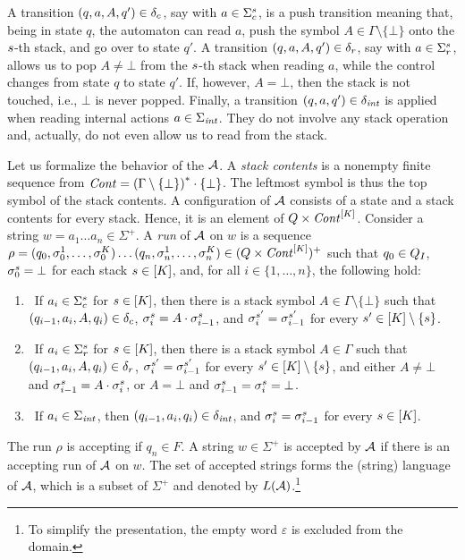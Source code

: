 \documentclass{LMCS}
\begin{document}
A transition $(q,a,A,q') \in \delta_c$, say with $a \in \Sigma_c^s$, is a
push transition meaning that, being in state $q$, the automaton can read $a$,
push the symbol $A \in \Gamma \setminus \{\bot\}$ onto the $s$-th stack,
and go over to state $q'$. A transition $(q,a,A,q') \in \delta_r$, say with $a
\in \Sigma_r^s$, allows us to pop $A \neq \bot$ from the $s$-th stack
when reading $a$, while the control changes from state $q$ to state $q'$. If,
however, $A = \bot$, then the stack is not touched, i.e., $\bot$ is never
popped. Finally, a transition $(q,a,q') \in \delta_{\mathit{int}}$ is applied when reading
internal actions $a \in \Sigma_{\mathit{int}}$. They do not involve any stack operation
and, actually, do not even allow us to read from the stack.

Let us formalize the behavior of the \MVPA $\mathcal{A}$. A \emph{stack contents} is a
nonempty finite sequence from $\mathit{Cont}={(\Gamma \setminus \{\bot\})}^\ast
\cdot \{\bot\}$. The leftmost symbol is thus the top symbol of the stack
contents. A configuration of $\mathcal{A}$ consists of a state and a stack contents
for every stack. Hence, it is an element of $Q \times \mathit{Cont}^{[K]}$.
Consider a string $w = a_1 \ldots a_n \in \Sigma^+$. A \emph{run} of $\mathcal{A}$ on
$w$ is a sequence $\rho = (q_0,\sigma_0^1, \ldots, \sigma_0^K) \ldots
(q_n,\sigma_n^1, \ldots, \sigma_n^K) \in (Q \times \mathit{Cont}^{[K]})^+$
such that $q_0 \in Q_I$, $\sigma_0^s = \bot$ for each stack $s \in
[K]$, and, for all $i \in \{1,\ldots,n\}$, the following hold:
\begin{enumerate}
\item\noindent{\hskip-11 pt\bf [Push]:}\ If $a_i \in \Sigma_c^s$ for $s \in [K]$, then
  there is a stack symbol $A \in \Gamma \setminus \{\bot\}$ such that
  $(q_{i-1},a_i,A,q_i) \in \delta_c$, $\sigma_i^s = A \cdot
  \sigma_{i-1}^s$, and $\sigma_i^{s'} = \sigma_{i-1}^{s'}$ for
  every $s' \in [K] \setminus \{s\}$.
\item\noindent{\hskip-11 pt\bf [Pop]:}\ If $a_i \in \Sigma_r^s$ for $s \in [K]$, then
  there is a stack symbol $A \in \Gamma$ such that $(q_{i-1},a_i,A,q_i) \in
  \delta_r$, $\sigma_i^{s'} = \sigma_{i-1}^{s'}$ for every $s' \in
  [K] \setminus \{s\}$, and either $A \neq \bot$ and
  $\sigma_{i-1}^s = A \cdot \sigma_i^s$, or $A = \bot$ and
  $\sigma_{i-1}^s = \sigma_i^s = \bot$.
\item\noindent{\hskip-11 pt\bf [Internal]:}\ If $a_i \in \Sigma_{\mathit{int}}$, then $(q_{i-1},a_i,q_i) \in
  \delta_{\mathit{int}}$, and $\sigma_i^s = \sigma_{i-1}^s$ for every $s
  \in [K]$.
\end{enumerate}
The run $\rho$ is accepting if $q_n \in F$. A string $w \in \Sigma^+$ is
accepted by $\mathcal{A}$ if there is an accepting run of $\mathcal{A}$ on $w$. The set of
accepted strings forms the (string) language of $\mathcal{A}$, which is a subset of
$\Sigma^+$ and denoted by $L(\mathcal{A})$.\footnote{To simplify the presentation, the
  empty word $\varepsilon$ is excluded from the domain.}
\end{document}
